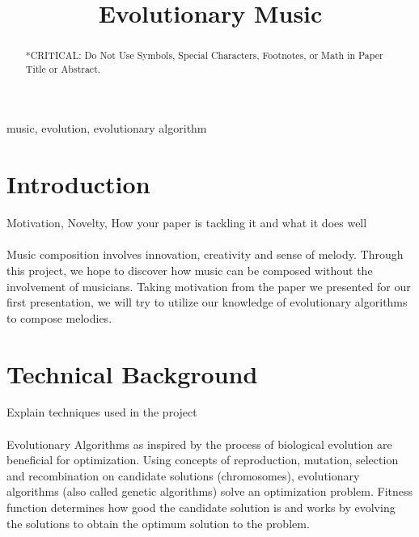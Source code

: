 \documentclass[conference]{IEEEtran}
\begin{document}
\title{Evolutionary Music%
}

\author{
\and
{}
}

\maketitle

\begin{abstract}
*CRITICAL: Do Not Use Symbols, Special Characters, Footnotes, 
or Math in Paper Title or Abstract.
\end{abstract}

\begin{IEEEkeywords}
music, evolution, evolutionary algorithm
\end{IEEEkeywords}

\section{Introduction}
Motivation, Novelty, How your paper is tackling it and what it does well\\
\\
Music composition involves innovation, creativity and sense of melody. Through this project, we hope to discover how music can be composed without the involvement of musicians. Taking motivation from the paper we presented for our first presentation, we will try to utilize our knowledge of evolutionary algorithms to compose melodies.


\section{Technical Background}
Explain techniques used in the project\\\\
Evolutionary Algorithms as inspired by the process of biological evolution are beneficial for optimization. Using concepts of reproduction, mutation, selection and recombination on candidate solutions (chromosomes), evolutionary algorithms (also called genetic algorithms) solve an optimization problem. Fitness function determines how good the candidate solution is and works by evolving the solutions to obtain the optimum solution to the problem.
\end{document}
